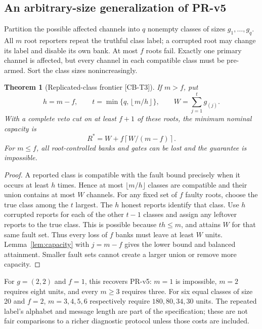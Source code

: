\documentclass[11pt,a4paper]{article}
\newtheorem{theorem}{Theorem}
\theoremstyle{definition}\newtheorem{definition}{Definition}
\newcommand{\sid}[1]{\textnormal{\textsf{[#1]}}}
\newcommand{\ceil}[1]{\left\lceil #1\right\rceil}
\newcommand{\floor}[1]{\left\lfloor #1\right\rfloor}
\newcommand{\Rmin}{R^*}
\begin{document}
\subsection{An arbitrary-size generalization of PR-v5}
Partition the possible affected channels into $q$ nonempty classes of sizes $g_1,\ldots,g_q$. All $m$ root reporters repeat the truthful class label; a corrupted root may change its label and disable its own bank. At most $f$ roots fail. Exactly one primary channel is affected, but every channel in each compatible class must be pre-armed. Sort the class sizes nonincreasingly.

\begin{theorem}[Replicated-class frontier \sid{CB-T3}]
\label{thm:replicated}
If $m>f$, put
\begin{equation}
 h=m-f,\qquad t=\min\{q,\floor{m/h}\},\qquad W=\sum_{j=1}^{t}g_{(j)}.
\end{equation}
With a complete veto cut on at least $f+1$ of these roots, the minimum nominal capacity is
\begin{equation}
\boxed{\Rmin=W+f\ceil{W/(m-f)}.}
\label{eq:replicated}
\end{equation}
For $m\leq f$, all root-controlled banks and gates can be lost and the guarantee is impossible.
\end{theorem}
\begin{proof}
A reported class is compatible with the fault bound precisely when it occurs at least $h$ times. Hence at most $\lfloor m/h\rfloor$ classes are compatible and their union contains at most $W$ channels. For any fixed set of $f$ faulty roots, choose the true class among the $t$ largest. The $h$ honest reports identify that class. Use $h$ corrupted reports for each of the other $t-1$ classes and assign any leftover reports to the true class. This is possible because $th\leq m$, and attains $W$ for that same fault set. Thus every loss of $f$ banks must leave at least $W$ units. Lemma~\ref{lem:capacity} with $j=m-f$ gives the lower bound and balanced attainment. Smaller fault sets cannot create a larger union or remove more capacity.
\end{proof}
For $g=(2,2)$ and $f=1$, this recovers PR-v5: $m=1$ is impossible, $m=2$ requires eight units, and every $m\geq3$ requires three. For six equal classes of size 20 and $f=2$, $m=3,4,5,6$ respectively require $180,80,34,30$ units. The repeated label's alphabet and message length are part of the specification; these are not fair comparisons to a richer diagnostic protocol unless those costs are included.
\end{document}
